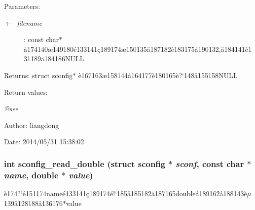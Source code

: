 \begin{Desc}
\item[Parameters:]
\begin{description}
\item[\mbox{$\leftarrow$} {\em filename}]: const char$\ast$ \aa{}174140\ae{}149180\'{e}133141\c{c}189174\ae{}150135\"{a}187182\`{e}183175\aa{}190132,\"{a}184141\`{e}131189\"{a}184186NULL \end{description}
\end{Desc}
\begin{Desc}
\item[Returns:]struct sconfig$\ast$ \`{e}167163\ae{}158144\aa{}164177\`{e}180165\`{e}?`148\aa{}155158NULL \end{Desc}
\begin{Desc}
\item[Return values:]
\begin{description}
\item[{\em @see}]\end{description}
\end{Desc}
\begin{Desc}
\item[Author:]liangdong \end{Desc}
\begin{Desc}
\item[Date:]2014/05/31 15:38:02 \end{Desc}
\subsubsection{\setlength{\rightskip}{0pt plus 5cm}int sconfig\_\-read\_\-double (struct sconfig $\ast$ {\em sconf}, const char $\ast$ {\em name}, double $\ast$ {\em value})}\label{sconfig_8h_a8}


\`{e}174?`\'{e}151174name\'{e}133141\c{c}189174\'{e}!`185\aa{}185182\"{a}187165double\aa{}189162\aa{}188143\`{e}$\mu$139\aa{}128188\aa{}136176$\ast$value 

